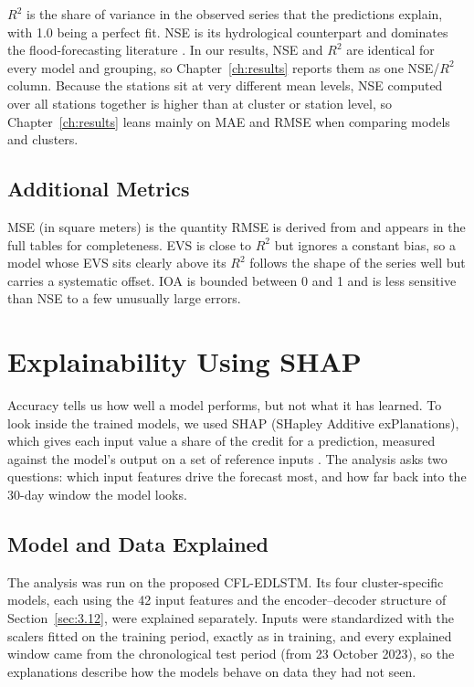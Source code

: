 $R^2$ is the share of variance in the observed series that the predictions
explain, with 1.0 being a perfect fit. NSE is its hydrological counterpart and
dominates the flood-forecasting literature \cite{NashSutcliffe1970}. In our
results, NSE and $R^2$ are identical for every model and grouping, so
Chapter~\ref{ch:results} reports them as one NSE/$R^2$ column. Because the
stations sit at very different mean levels, NSE computed over all stations
together is higher than at cluster or station level, so
Chapter~\ref{ch:results} leans mainly on MAE and RMSE when comparing models and
clusters.

\subsection{Additional Metrics}
\label{sec:3.16.4}

MSE (in square meters) is the quantity RMSE is derived from and appears in the
full tables for completeness. EVS is close to $R^2$ but ignores a constant bias,
so a model whose EVS sits clearly above its $R^2$ follows the shape of the series
well but carries a systematic offset. IOA is bounded between 0 and 1 and is less
sensitive than NSE to a few unusually large errors.

\section{Explainability Using SHAP}
\label{sec:3.17}

Accuracy tells us how well a model performs, but not what it has learned. To
look inside the trained models, we used SHAP (SHapley Additive exPlanations),
which gives each input value a share of the credit for a prediction, measured
against the model's output on a set of reference inputs \cite{Lundberg2017}. The
analysis asks two questions: which input features drive the forecast most, and
how far back into the 30-day window the model looks.

\subsection{Model and Data Explained}
\label{sec:3.17.1}

The analysis was run on the proposed CFL-EDLSTM. Its four cluster-specific
models, each using the 42 input features and the encoder--decoder structure of
Section~\ref{sec:3.12}, were explained separately. Inputs were standardized with
the scalers fitted on the training period, exactly as in training, and every
explained window came from the chronological test period (from 23 October 2023),
so the explanations describe how the models behave on data they had not seen.

